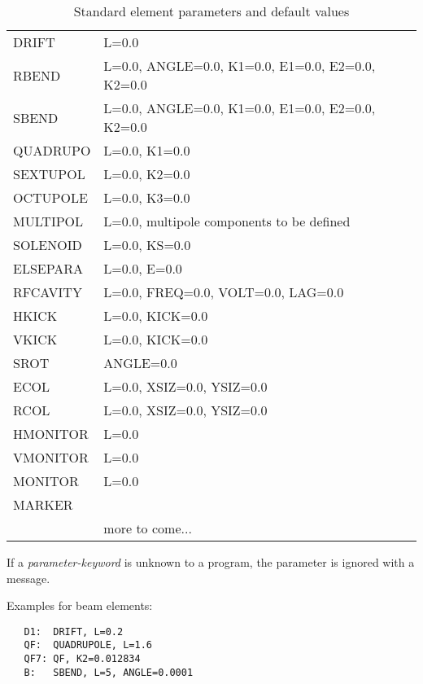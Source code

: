 \documentclass{article}
\begin{document}
\begin{table}[htb]
  \centering
  \caption{Standard element parameters and default values}
  \label{values}
  \vspace{1em}
  \begin{tabular}{|lp{}|}
    \hline
    DRIFT    & L=0.0 \\
    RBEND    & L=0.0, ANGLE=0.0, K1=0.0, E1=0.0, E2=0.0, K2=0.0 \\
    SBEND    & L=0.0, ANGLE=0.0, K1=0.0, E1=0.0, E2=0.0, K2=0.0 \\
    QUADRUPO & L=0.0, K1=0.0 \\
    SEXTUPOL & L=0.0, K2=0.0 \\
    OCTUPOLE & L=0.0, K3=0.0 \\
    MULTIPOL & L=0.0, multipole components to be defined \\
    SOLENOID & L=0.0, KS=0.0 \\
    ELSEPARA & L=0.0, E=0.0 \\
    RFCAVITY & L=0.0, FREQ=0.0, VOLT=0.0, LAG=0.0 \\
    HKICK    & L=0.0, KICK=0.0 \\
    VKICK    & L=0.0, KICK=0.0 \\
    SROT     & ANGLE=0.0 \\
    ECOL     & L=0.0, XSIZ=0.0, YSIZ=0.0 \\
    RCOL     & L=0.0, XSIZ=0.0, YSIZ=0.0 \\
    HMONITOR & L=0.0 \\
    VMONITOR & L=0.0 \\
    MONITOR  & L=0.0 \\
    MARKER   & \\
             & more to come... \\
    \hline
  \end{tabular}
\end{table}
If a {\em parameter-keyword} is unknown to a program, the parameter
is ignored with a message.

Examples for beam elements:
\begin{verbatim}
   D1:  DRIFT, L=0.2
   QF:  QUADRUPOLE, L=1.6
   QF7: QF, K2=0.012834
   B:   SBEND, L=5, ANGLE=0.0001
\end{verbatim}
\end{document}
